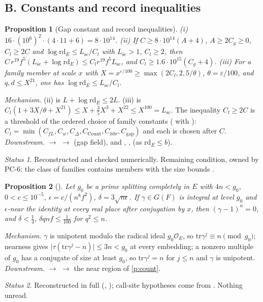 \documentclass[11pt]{article}
\newcommand{\PC}[1]{\textsf{PC-#1}}
\newcommand{\Ok}{\mathcal O}
\newcommand{\rd}{\mathrm{rd}}
\newtheorem{prop}{Proposition}
\theoremstyle{remark}
\newtheorem*{status}{Status}
\begin{document}
\subsection*{B. Constants and record inequalities}

\begin{prop}[Gap constant and record inequalities]\label{p:rec}
(i) $16\cdot(10^6)^2\cdot(4\cdot11+6)=8\cdot10^{14}$. (ii) If $C\ge8\cdot10^{14}(A+4)$, $A\ge2C_g\ge0$, $C_l\ge2C$ and $\log\rd_E\le L_{\mathrm{sc}}/C_l$ with $L_{\mathrm{sc}}>1$, $C_l\ge2$, then $C\,r^{19}f^5(L_{\mathrm{sc}}+\log\rd_E)\le C_lr^{19}f^5L_{\mathrm{sc}}$, and $C_l\ge1.6\cdot10^{15}(C_g+4)$.
(iii) For a family member at scale $x$ with $X=x^{\varepsilon/100}\ge\max(2C_l,2,5/\theta)$, $\theta=\varepsilon/100$, and $q,d\le X^{21}$, one has $\log\rd_E\le L_{\mathrm{sc}}/C_l$.
\end{prop}
\emph{Mechanism.} (ii) is $L+\log\rd_E\le2L$. (iii) is $C_l(1+3X/\theta+X^{21})\le X+\tfrac35X^3+X^{22}\le X^{100}=L_{\mathrm{sc}}$. The inequality $C_l\ge2C$ is a threshold of the ordered choice of family constants ( with ): $C_l=\min(C_{fL},C_w,C_\Delta,C_{\mathrm{Count}},C_{h0r},C_{\mathrm{gap}})$ and each is chosen after $C$.
\emph{Downstream.}  $\to$  $\to$  (gap field), and , ,  (as $\rd_E\le b$).
\begin{status}Reconstructed and checked numerically. Remaining condition, owned by \PC{6}: the class of families contains  members with the size bounds .\end{status}

\begin{prop}[]\label{p:nu}
Let $g_0$ be a prime splitting completely in $E$ with $4n< g_0$, $0< c\le10^{-5}$, $\epsilon=c/(n^8f^2)$, $\delta=3\sqrt{n\epsilon}$. If $\gamma\in G(F)$ is integral at level $g_0$ and $\epsilon$-near the identity at every real place after conjugation by $x$, then $(\gamma-1)^n=0$, and $\delta<\tfrac14$, $\delta qnf\le\tfrac1{100}$ for $q^2\le n$.
\end{prop}
\emph{Mechanism.} $\gamma$ is unipotent modulo the radical ideal $g_0\Ok_E$, so $\mathrm{tr}\gamma^j\equiv n\pmod{g_0}$; nearness gives $\lvert\tau(\mathrm{tr}\gamma^j-n)\rvert\le3n< g_0$ at every embedding; a nonzero multiple of $g_0$ has a conjugate of size at least $g_0$, so $\mathrm{tr}\gamma^j=n$ for $j\le n$ and $\gamma$ is unipotent.
\emph{Downstream.}  $\to$  $\to$ the near region of \ref{p:count}.
\begin{status}Reconstructed in full (, ); call-site hypotheses come from . Nothing unread.\end{status}
\end{document}

